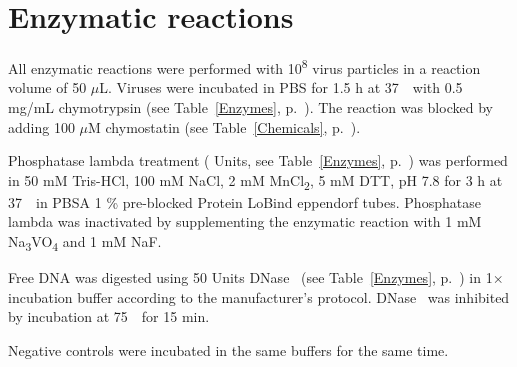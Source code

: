 
\section{Enzymatic reactions}
 
All enzymatic reactions were performed with 10\textsuperscript{8} virus particles in a reaction volume of 50 $\mu$L. Viruses were incubated in PBS for 1.5 h at 37~\textcelsius~with 0.5 mg/mL chymotrypsin (see Table~\ref{Enzymes}, p.~\pageref{Enzymes}). The reaction was blocked by adding 100 $\mu$M chymostatin (see Table~\ref{Chemicals}, p.~\pageref{Chemicals}). 

Phosphatase lambda treatment ( Units, see Table~\ref{Enzymes}, p.~\pageref{Enzymes}) was performed in 50 mM Tris-HCl, 100 mM NaCl, 2 mM MnCl\textsubscript{2}, 5 mM DTT, pH 7.8 for 3 h at 37~\textcelsius~in PBSA 1 \% pre-blocked Protein LoBind eppendorf tubes. Phosphatase lambda was inactivated by supplementing the enzymatic reaction with 1 mM Na\textsubscript{3}VO\textsubscript{4} and 1 mM NaF. 

Free DNA was digested using 50 Units DNase~ (see Table~\ref{Enzymes}, p.~\pageref{Enzymes}) in 1$\times$ incubation buffer according to the manufacturer’s protocol. DNase~ was inhibited by incubation at 75~\textcelsius~for 15 min. 

Negative controls were incubated in the same buffers for the same time.





